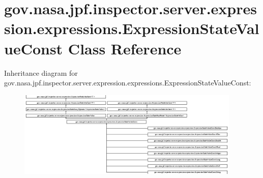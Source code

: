 \hypertarget{classgov_1_1nasa_1_1jpf_1_1inspector_1_1server_1_1expression_1_1expressions_1_1_expression_state_value_const}{}\section{gov.\+nasa.\+jpf.\+inspector.\+server.\+expression.\+expressions.\+Expression\+State\+Value\+Const Class Reference}
\label{classgov_1_1nasa_1_1jpf_1_1inspector_1_1server_1_1expression_1_1expressions_1_1_expression_state_value_const}
Inheritance diagram for gov.\+nasa.\+jpf.\+inspector.\+server.\+expression.\+expressions.\+Expression\+State\+Value\+Const\+:\begin{figure}[H]
\begin{center}
\leavevmode
\includegraphics[height=4.112994cm]{classgov_1_1nasa_1_1jpf_1_1inspector_1_1server_1_1expression_1_1expressions_1_1_expression_state_value_const}
\end{center}
\end{figure}
